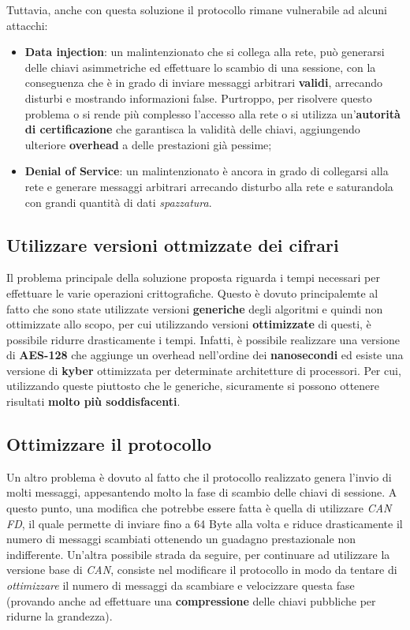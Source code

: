 Tuttavia, anche con questa soluzione il protocollo rimane vulnerabile ad alcuni attacchi:
\begin{itemize}
	\item \textbf{Data injection}: un malintenzionato che si collega alla rete, può generarsi delle chiavi asimmetriche ed effettuare lo scambio di una sessione, con la conseguenza che è in grado di inviare messaggi arbitrari \textbf{validi}, arrecando disturbi e mostrando informazioni false. Purtroppo, per risolvere questo problema o si rende più complesso l'accesso alla rete o si utilizza un'\textbf{autorità di certificazione} che garantisca la validità delle chiavi, aggiungendo ulteriore \textbf{overhead} a delle prestazioni già pessime;
	\item \textbf{Denial of Service}: un malintenzionato è ancora in grado di collegarsi alla rete e generare messaggi arbitrari arrecando disturbo alla rete e saturandola con grandi quantità di dati \emph{spazzatura}.
\end{itemize}

\subsection{Utilizzare versioni ottmizzate dei cifrari}
Il problema principale della soluzione proposta riguarda i tempi necessari per effettuare le varie operazioni crittografiche. Questo è dovuto principalemte al fatto che sono state utilizzate versioni \textbf{generiche} degli algoritmi e quindi non ottimizzate allo scopo, per cui utilizzando versioni \textbf{ottimizzate} di questi, è possibile ridurre drasticamente i tempi. Infatti, è possibile realizzare una versione di \textbf{AES-128} che aggiunge un overhead nell'ordine dei \textbf{nanosecondi} \cite{bozdal_samie_jennions_2018} ed esiste una versione di \textbf{kyber} ottimizzata per determinate architetture di processori. Per cui, utilizzando queste piuttosto che le generiche, sicuramente si possono ottenere risultati \textbf{molto più soddisfacenti}.

\subsection{Ottimizzare il protocollo}
Un altro problema è dovuto al fatto che il protocollo realizzato genera l'invio di molti messaggi, appesantendo molto la fase di scambio delle chiavi di sessione. A questo punto, una modifica che potrebbe essere fatta è quella di utilizzare \emph{CAN FD}, il quale permette di inviare fino a 64 Byte alla volta e riduce drasticamente il numero di messaggi scambiati ottenendo un guadagno prestazionale non indifferente. Un'altra possibile strada da seguire, per continuare ad utilizzare la versione base di \emph{CAN}, consiste nel modificare il protocollo in modo da tentare di \emph{ottimizzare} il numero di messaggi da scambiare e velocizzare questa fase (provando anche ad effettuare una \textbf{compressione} delle chiavi pubbliche per ridurne la grandezza).

